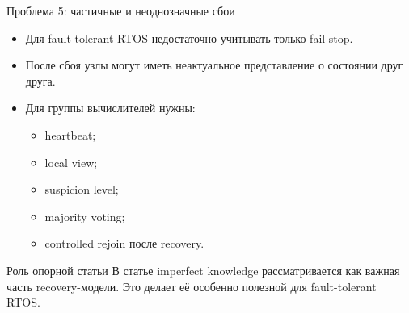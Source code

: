 \begin{frame}{Проблема 5: частичные и неоднозначные сбои}
	\begin{itemize}
		\item Для fault-tolerant RTOS недостаточно учитывать только fail-stop.
		\item После сбоя узлы могут иметь неактуальное представление о состоянии друг друга.
		\item Для группы вычислителей нужны:
		\begin{itemize}
			\item heartbeat;
			\item local view;
			\item suspicion level;
			\item majority voting;
			\item controlled rejoin после recovery.
		\end{itemize}
	\end{itemize}
	
	\vspace{0.3cm}
	
	\begin{block}{Роль опорной статьи}
		В статье imperfect knowledge рассматривается как важная часть recovery-модели.
		Это делает её особенно полезной для fault-tolerant RTOS.
	\end{block}
\end{frame}